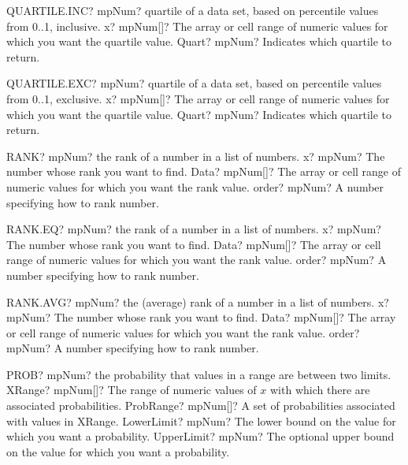 \documentclass[12pt,a4paper,openany]{book}
\begin{document}
\begin{mpFunctionsExtract}
\mpWorksheetFunctionTwoNotImplemented
{QUARTILE.INC? mpNum? quartile of a data set, based on percentile values from 0..1, inclusive.}
{x? mpNum[]?  The array or cell range of numeric values for which you want the quartile value.}
{Quart? mpNum? Indicates which quartile to return.}
\end{mpFunctionsExtract}

\begin{mpFunctionsExtract}
\mpWorksheetFunctionTwoNotImplemented
{QUARTILE.EXC? mpNum? quartile of a data set, based on percentile values from 0..1, exclusive.}
{x? mpNum[]?  The array or cell range of numeric values for which you want the quartile value.}
{Quart? mpNum? Indicates which quartile to return.}
\end{mpFunctionsExtract}

\begin{mpFunctionsExtract}
\mpWorksheetFunctionThreeNotImplemented
{RANK? mpNum? the rank of a number in a list of numbers.}
{x? mpNum? The number whose rank you want to find.}
{Data? mpNum[]?  The array or cell range of numeric values for which you want the rank value.}
{order? mpNum? A number specifying how to rank number.}
\end{mpFunctionsExtract}

\begin{mpFunctionsExtract}
\mpWorksheetFunctionThreeNotImplemented
{RANK.EQ? mpNum? the rank of a number in a list of numbers.}
{x? mpNum? The number whose rank you want to find.}
{Data? mpNum[]?  The array or cell range of numeric values for which you want the rank value.}
{order? mpNum? A number specifying how to rank number.}
\end{mpFunctionsExtract}

\begin{mpFunctionsExtract}
\mpWorksheetFunctionThreeNotImplemented
{RANK.AVG? mpNum? the (average) rank of a number in a list of numbers.}
{x? mpNum? The number whose rank you want to find.}
{Data? mpNum[]?  The array or cell range of numeric values for which you want the rank value.}
{order? mpNum? A number specifying how to rank number.}
\end{mpFunctionsExtract}

\begin{mpFunctionsExtract}
\mpWorksheetFunctionFourNotImplemented
{PROB? mpNum? the probability that values in a range are between two limits.}
{XRange? mpNum[]? The range of numeric values of $x$ with which there are associated probabilities.}
{ProbRange? mpNum[]?  A set of probabilities associated with values in \textsf{XRange}.}
{LowerLimit? mpNum? The lower bound on the value for which you want a probability.}
{UpperLimit? mpNum? The optional upper bound on the value for which you want a probability.}
\end{mpFunctionsExtract}
\end{document}
